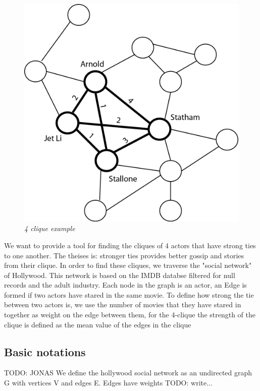 \documentclass{article}
\begin{document}
\begin{figure}[H]
\begin{center}
\includegraphics[scale=0.45]{graph_4clique.png}
\end{center}
\caption{\small {\it {4 clique example}}} 
\label{fig:4 clique example}
\end{figure}

We want to provide a tool for finding the cliques of 4 actors that have strong ties to one another. The theises is: stronger ties provides better gossip and stories from their clique. In order to find these cliques, we traverse the "social network" of Hollywood. This network is based on the IMDB databse filtered for null records and the adult industry.
Each node in the graph is an actor, an Edge is formed if two actors have stared in the same movie.
To define how strong the tie between two actors is, we use the number of movies that they have stared in together as weight on the edge between them, for the 4-clique the strength of the clique is defined as the mean value of the edges in the clique

\subsection{Basic notations}
TODO: JONAS
We define the hollywood social network as an undirected graph G with vertices V and edges E.
Edges have weights TODO: write...
\end{document}
